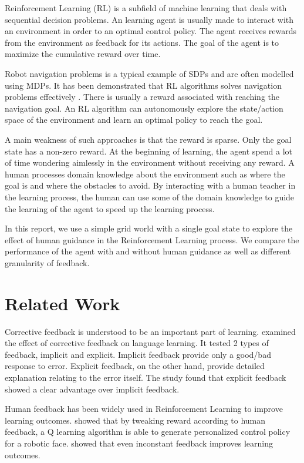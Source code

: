 \documentclass[conference]{IEEEtran}
\begin{document}
Reinforcement Learning (RL) is a subfield of machine learning that deals with sequential decision problems. An learning agent is usually made to interact with an environment in order to an optimal control policy. The agent receives rewards from the environment as feedback for its actions. The goal of the agent is to maximize the cumulative reward over time.

Robot navigation problems is a typical example of SDPs and are often modelled using MDPs. It has been demonstrated that RL algorithms solves navigation problems effectively \cite{zhuDeepReinforcementLearning2021}. There is usually a reward associated with reaching the navigation goal. An RL algorithm can autonomously explore the state/action space of the environment and learn an optimal policy to reach the goal.

A main weakness of such approaches is that the reward is sparse. Only the goal state has a non-zero reward. At the beginning of learning, the agent spend a lot of time wondering aimlessly in the environment without receiving any reward. A human processes domain knowledge about the environment such as where the goal is and where the obstacles to avoid. By interacting with a human teacher in the learning process, the human can use some of the domain knowledge to guide the learning of the agent to speed up the learning process.

In this report, we use a simple grid world with a single goal state to explore the effect of human guidance in the Reinforcement Learning process. We compare the performance of the agent with and without human guidance as well as different granularity of feedback.

\section{Related Work}

Corrective feedback is understood to be an important part of learning. \cite{ellisIMPLICITEXPLICITCORRECTIVE2006} examined the effect of corrective feedback on language learning. It tested 2 types of feedback, implicit and explicit. Implicit feedback provide only a good/bad response to error. Explicit feedback, on the other hand, provide detailed explanation relating to the error itself. The study found that explicit feedback showed a clear advantage over implicit feedback.

Human feedback has been widely used in Reinforcement Learning \cite{liHumanCenteredReinforcementLearning2019} to improve learning outcomes. \cite{iidaGeneratingPersonalityCharacter1998} showed that by tweaking reward according to human feedback, a Q learning algorithm is able to generate personalized control policy for a robotic face. \cite{tenorio-gonzalezDynamicRewardShaping2010} showed that even inconstant feedback improves learning outcomes.
\end{document}
